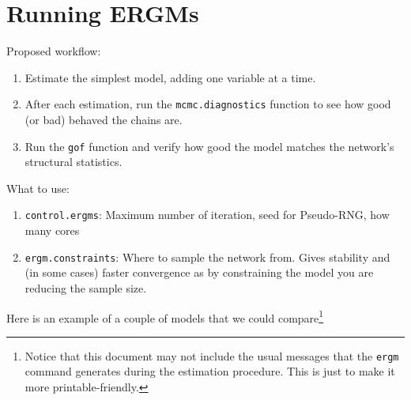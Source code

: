 \documentclass[]{book}
\newenvironment{Shaded}{\begin{snugshade}}{\end{snugshade}}
\newcommand{\ControlFlowTok}[1]{\textcolor[rgb]{0.13,0.29,0.53}{\textbf{#1}}}
\newcommand{\DataTypeTok}[1]{\textcolor[rgb]{0.13,0.29,0.53}{#1}}
\newcommand{\DecValTok}[1]{\textcolor[rgb]{0.00,0.00,0.81}{#1}}
\newcommand{\FloatTok}[1]{\textcolor[rgb]{0.00,0.00,0.81}{#1}}
\newcommand{\KeywordTok}[1]{\textcolor[rgb]{0.13,0.29,0.53}{\textbf{#1}}}
\newcommand{\NormalTok}[1]{#1}
\newcommand{\OperatorTok}[1]{\textcolor[rgb]{0.81,0.36,0.00}{\textbf{#1}}}
\newcommand{\OtherTok}[1]{\textcolor[rgb]{0.56,0.35,0.01}{#1}}
\newcommand{\StringTok}[1]{\textcolor[rgb]{0.31,0.60,0.02}{#1}}
\begin{document}
\begin{Shaded}
\end{Shaded}

\hypertarget{running-ergms}{%
\section{Running ERGMs}\label{running-ergms}}

Proposed workflow:

\begin{enumerate}
\def\labelenumi{\arabic{enumi}.}
\item
  Estimate the simplest model, adding one variable at a time.
\item
  After each estimation, run the \texttt{mcmc.diagnostics} function to see how good (or bad) behaved the chains are.
\item
  Run the \texttt{gof} function and verify how good the model matches the network's structural statistics.
\end{enumerate}

What to use:

\begin{enumerate}
\def\labelenumi{\arabic{enumi}.}
\item
  \texttt{control.ergms}: Maximum number of iteration, seed for Pseudo-RNG, how many cores
\item
  \texttt{ergm.constraints}: Where to sample the network from. Gives stability and (in some cases) faster convergence as by constraining the model you are reducing the sample size.
\end{enumerate}

Here is an example of a couple of models that we could compare\footnote{Notice that this document may not include the usual messages that the \texttt{ergm} command generates during the estimation procedure. This is just to make it more printable-friendly.}
\end{document}
